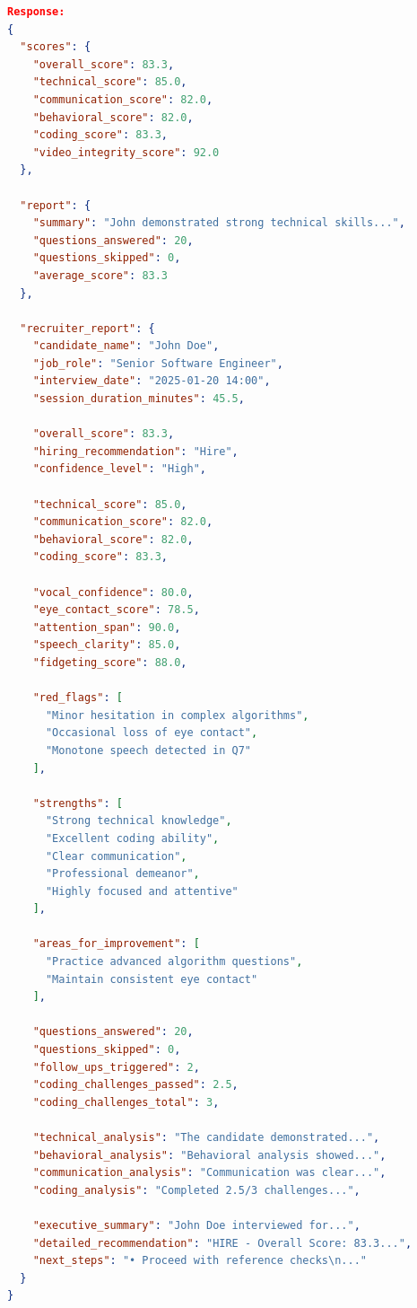 \documentclass[12pt,a4paper]{article}
\begin{document}
\begin{lstlisting}[language=json, caption=End Interview Response]
Response:
{
  "scores": {
    "overall_score": 83.3,
    "technical_score": 85.0,
    "communication_score": 82.0,
    "behavioral_score": 82.0,
    "coding_score": 83.3,
    "video_integrity_score": 92.0
  },
  
  "report": {
    "summary": "John demonstrated strong technical skills...",
    "questions_answered": 20,
    "questions_skipped": 0,
    "average_score": 83.3
  },
  
  "recruiter_report": {
    "candidate_name": "John Doe",
    "job_role": "Senior Software Engineer",
    "interview_date": "2025-01-20 14:00",
    "session_duration_minutes": 45.5,
    
    "overall_score": 83.3,
    "hiring_recommendation": "Hire",
    "confidence_level": "High",
    
    "technical_score": 85.0,
    "communication_score": 82.0,
    "behavioral_score": 82.0,
    "coding_score": 83.3,
    
    "vocal_confidence": 80.0,
    "eye_contact_score": 78.5,
    "attention_span": 90.0,
    "speech_clarity": 85.0,
    "fidgeting_score": 88.0,
    
    "red_flags": [
      "Minor hesitation in complex algorithms",
      "Occasional loss of eye contact",
      "Monotone speech detected in Q7"
    ],
    
    "strengths": [
      "Strong technical knowledge",
      "Excellent coding ability",
      "Clear communication",
      "Professional demeanor",
      "Highly focused and attentive"
    ],
    
    "areas_for_improvement": [
      "Practice advanced algorithm questions",
      "Maintain consistent eye contact"
    ],
    
    "questions_answered": 20,
    "questions_skipped": 0,
    "follow_ups_triggered": 2,
    "coding_challenges_passed": 2.5,
    "coding_challenges_total": 3,
    
    "technical_analysis": "The candidate demonstrated...",
    "behavioral_analysis": "Behavioral analysis showed...",
    "communication_analysis": "Communication was clear...",
    "coding_analysis": "Completed 2.5/3 challenges...",
    
    "executive_summary": "John Doe interviewed for...",
    "detailed_recommendation": "HIRE - Overall Score: 83.3...",
    "next_steps": "• Proceed with reference checks\n..."
  }
}
\end{lstlisting}
\end{document}
